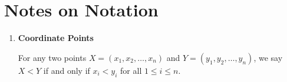 \section{Notes on Notation}

\begin{enumerate}
\item \textbf{Coordinate Points}

For any two points $X = (x_1, x_2, \hdots, x_n)$ and $Y = (y_1, y_2, \hdots, y_n)$, we say $X < Y$ if and only if $x_i < y_i$ for all $1 \leq i \leq n$.
\end{enumerate}
